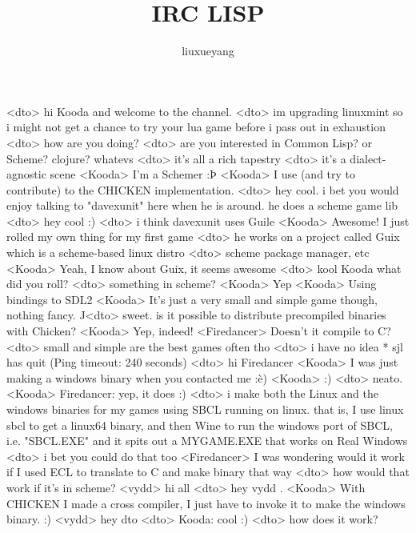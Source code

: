 \documentclass[a4paper,11pt]{article}
\title{IRC LISP}
\author{liuxueyang}
\begin{document}
\maketitle
\tableofcontents

\begin{abstract}
\end{abstract}

\section{}


<dto> hi Kooda and welcome to the channel.
<dto> im upgrading linuxmint so i might not get a chance to try your lua game before i pass out in exhaustion
<dto> how are you doing?
<dto> are you interested in Common Lisp? or Scheme? clojure? whatevs
<dto> it's all a rich tapestry
<dto> it's a dialect-agnostic scene
<Kooda> I’m a Schemer :Þ
<Kooda> I use (and try to contribute) to the CHICKEN implementation.
<dto> hey cool. i bet you would enjoy talking to "davexunit" here when he is around. he does a scheme game lib
<dto> hey cool :)
<dto> i think davexunit uses Guile
<Kooda> Awesome! I just rolled my own thing for my first game
<dto> he works on a project called Guix which is a scheme-based linux distro
<dto> scheme package manager, etc
<Kooda> Yeah, I know about Guix, it seems awesome
<dto> kool Kooda what did you roll?
<dto> something in scheme?
<Kooda> Yep
<Kooda> Using bindings to SDL2
<Kooda> It’s just a very small and simple game though, nothing fancy. ^^
<dto> sweet. is it possible to distribute precompiled binaries with Chicken?
<Kooda> Yep, indeed!
<Firedancer> Doesn't it compile to C?
<dto> small and simple are the best games often tho
<dto> i have no idea
* sjl has quit (Ping timeout: 240 seconds)
<dto> hi Firedancer
<Kooda> I was just making a windows binary when you contacted me :è)
<Kooda> :)
<dto> neato.
<Kooda> Firedancer: yep, it does :)
<dto> i make both the Linux and the windows binaries for my games using SBCL running on linux. that is, I use linux sbcl to get a linux64 binary, and then Wine to run the windows port of SBCL, i.e. "SBCL.EXE" and it spits out a MYGAME.EXE that works on Real Windows
<dto> i bet you could do that too
<Firedancer> I was wondering would it work if I used ECL to translate to C and make binary that way
<dto> how would that work if it's in scheme?
<vydd> hi all
<dto> hey vydd .
<Kooda> With CHICKEN I made a cross compiler, I just have to invoke it to make the windows binary. :)
<vydd> hey dto
<dto> Kooda: cool :)
<dto> how does it work?
\end{document}
